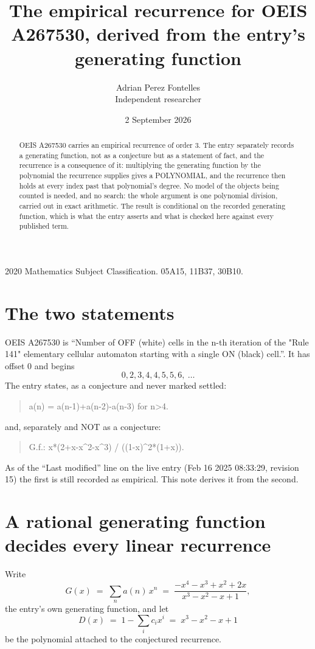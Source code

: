\documentclass[11pt,a4paper]{article}
\title{The empirical recurrence for OEIS A267530, derived from the entry's generating function}
\author{Adrian Perez Fontelles\\ \small Independent researcher}
\date{2 September 2026}
\theoremstyle{plain}
\theoremstyle{definition}
\begin{document}
\maketitle

\begin{abstract}
OEIS A267530 carries an empirical recurrence of order $3$. The entry separately records a
generating function, not as a conjecture but as a statement of fact, and the recurrence is a
consequence of it: multiplying the generating function by the polynomial the recurrence
supplies gives a POLYNOMIAL, and the recurrence then holds at every index past that
polynomial's degree. No model of the objects being counted is needed, and no search: the
whole argument is one polynomial division, carried out in exact arithmetic. The result is
conditional on the recorded generating function, which is what the entry asserts and what is
checked here against every published term.
\end{abstract}

\noindent\small 2020 Mathematics Subject Classification. 05A15, 11B37, 30B10.\normalsize

\section{The two statements}

OEIS A267530 is ``Number of OFF (white) cells in the n-th iteration of the "Rule 141" elementary cellular automaton starting with a single ON (black) cell.''. It has offset $0$ and begins
\[
0, 2, 3, 4, 4, 5, 5, 6,\ \dots
\]
The entry states, as a conjecture and never marked settled:
\begin{quote}
a(n) = a(n-1)+a(n-2)-a(n-3) for n>4.
\end{quote}
and, separately and NOT as a conjecture:
\begin{quote}
G.f.: x*(2+x-x\^{}2-x\^{}3) / ((1-x)\^{}2*(1+x)).
\end{quote}
As of the ``Last modified'' line on the live entry (Feb 16 2025 08:33:29, revision 15) the first is still
recorded as empirical. This note derives it from the second.

\section{A rational generating function decides every linear recurrence}

Write
\[
G(x)\;=\;\sum_{n}a(n)\,x^{n}\;=\;\frac{- x^{4} - x^{3} + x^{2} + 2 x}{x^{3} - x^{2} - x + 1},
\]
the entry's own generating function, and let
\[
D(x)\;=\;1-\sum_i c_i x^{i}\;=\;x^{3} - x^{2} - x + 1
\]
be the polynomial attached to the conjectured recurrence.
\end{document}
